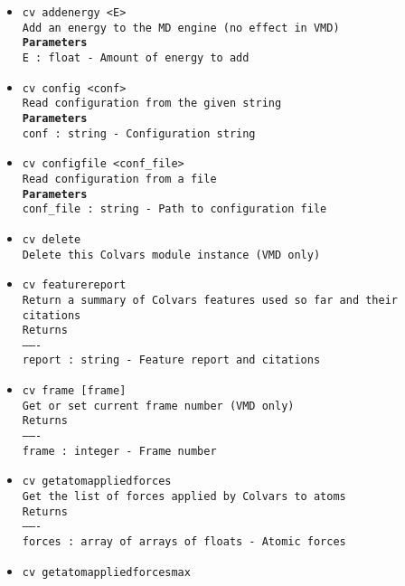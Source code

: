 \begin{itemize}
\item \texttt{cv addenergy <E>}
\\
\texttt{Add an energy to the MD engine (no effect in VMD)}
\\
\texttt{\textbf{Parameters}}
\\
\texttt{E : float - Amount of energy to add}
\item \texttt{cv config <conf>}
\\
\texttt{Read configuration from the given string}
\\
\texttt{\textbf{Parameters}}
\\
\texttt{conf : string - Configuration string}
\item \texttt{cv configfile <conf\_file>}
\\
\texttt{Read configuration from a file}
\\
\texttt{\textbf{Parameters}}
\\
\texttt{conf\_file : string - Path to configuration file}
\item \texttt{cv delete}
\\
\texttt{Delete this Colvars module instance (VMD only)}
\item \texttt{cv featurereport}
\\
\texttt{Return a summary of Colvars features used so far and their citations}
\\
\texttt{Returns}
\\
\texttt{-------}
\\
\texttt{report : string - Feature report and citations}
\item \texttt{cv frame [frame]}
\\
\texttt{Get or set current frame number (VMD only)}
\\
\texttt{Returns}
\\
\texttt{-------}
\\
\texttt{frame : integer - Frame number}
\item \texttt{cv getatomappliedforces}
\\
\texttt{Get the list of forces applied by Colvars to atoms}
\\
\texttt{Returns}
\\
\texttt{-------}
\\
\texttt{forces : array of arrays of floats - Atomic forces}
\item \texttt{cv getatomappliedforcesmax}
\\

\end{itemize}
